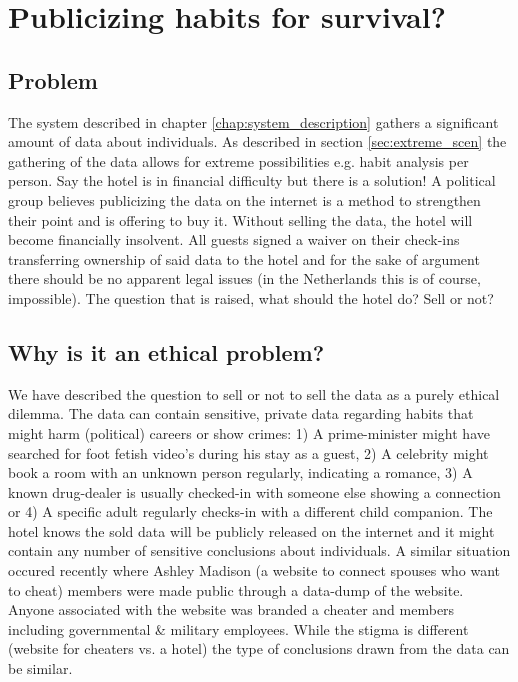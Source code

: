 \chapter{Publicizing habits for survival?}
\label{chap:selling_data}

\section{Problem}
The system described in chapter \ref{chap:system_description} gathers a significant amount of data about individuals. As described in section \ref{sec:extreme_scen} the gathering of the data allows for extreme possibilities e.g. habit analysis per person. Say the hotel is in financial difficulty but there is a solution! A political group believes publicizing the data on the internet is a method to strengthen their point and is offering to buy it. Without selling the data, the hotel will become financially insolvent. All guests signed a waiver on their check-ins transferring ownership of said data to the hotel and for the sake of argument there should be no apparent legal issues (in the Netherlands this is of course, impossible). The question that is raised, what should the hotel do? Sell or not?


\section{Why is it an ethical problem?}
We have described the question to sell or not to sell the data as a purely ethical dilemma. The data can contain sensitive, private data regarding habits that might harm (political) careers or show crimes: 1) A prime-minister might have searched for foot fetish video's during his stay as a guest, 2) A celebrity might book a room with an unknown person regularly, indicating a romance, 3) A known drug-dealer is usually checked-in with someone else showing a connection or 4) A specific adult regularly checks-in with a different child companion. The hotel knows the sold data will be publicly released on the internet and it might contain any number of sensitive conclusions about individuals. A similar situation occured recently where Ashley Madison (a website to connect spouses who want to cheat) members were made public through a data-dump of the website. Anyone associated with the website was branded a cheater and members including governmental \& military employees\cite{ashley_madison}. While the stigma is different (website for cheaters vs. a hotel) the type of conclusions drawn from the data can be similar.

